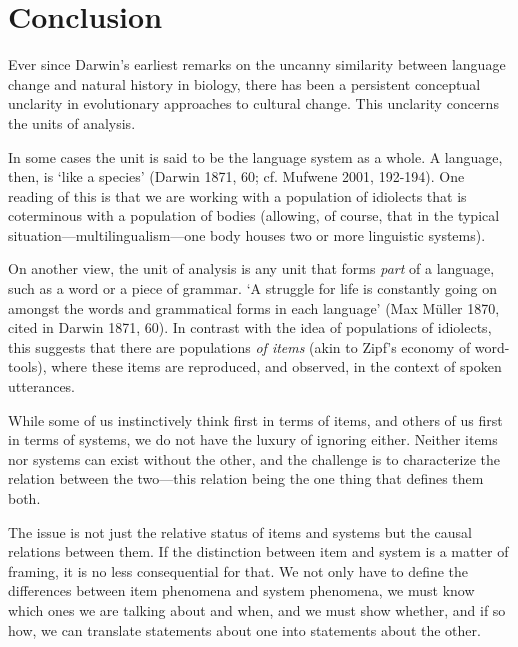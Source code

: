 \chapter{Conclusion}

Ever since Darwin's earliest remarks on the uncanny similarity between 
language change and natural history in biology, there has been a 
persistent conceptual unclarity in evolutionary approaches to cultural 
change. This unclarity concerns the units of analysis. 



In some cases the unit is said to be the language system as a whole. A 
language, then, is \textquoteleft like a species' (Darwin 1871, 60; cf. Mufwene 2001, 
192-194). One reading of this is that we are working with a population 
of idiolects that is coterminous with a population of bodies (allowing, 
of course, that in the typical situation---multilingualism---one body houses 
two or more linguistic systems). 



On another view, the unit of analysis is any unit that forms \textit{part} of a language, such as a word or a piece of grammar. \textquoteleft A struggle 
for life is constantly going on amongst the words and grammatical forms 
in each language' (Max M\"{u}ller 1870, cited in Darwin 1871, 60). In 
contrast with the idea of populations of idiolects, this suggests that 
there are populations \textit{of items }(akin to Zipf's economy of 
word-tools), where these items are reproduced, and observed, in the 
context of spoken utterances. 



While some of us instinctively think first in terms of items, and others 
of us first in terms of systems, we do not have the luxury of ignoring either. 
Neither items nor systems can exist without the other, and the challenge 
is to characterize the relation between the two---this relation being the 
one thing that defines them both. 



The issue is not just the relative status of items and systems but the 
causal relations between them. If the distinction 
between item and system is a matter of framing, it is no less 
consequential for that. We not only have to define the differences 
between item phenomena and system phenomena, we must know which ones we 
are talking about and when, and we must show whether, and if so how, we 
can translate statements about one into statements about the other. 



